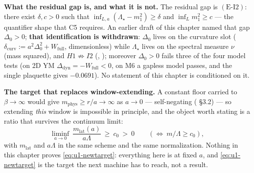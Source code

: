 \noindent\textbf{What the residual gap is, and what it is not.} The residual gap is
$(\mathrm{E\text{-}I2})$: there exist $\delta,c>0$ such that
$\inf_{L,a}(\Lambda_\star-m_1^2)\ge\delta$ and $\inf_L m_1^2\ge c$ --- the quantifier shape that
C5 requires. An earlier draft of this chapter named that gap $\Delta_0>0$; \textbf{that
identification is withdrawn}: $\Delta_0$ lives on the curvature slot
($\delta_{\mathrm{curv}}:=a^2\Delta_0^2+W_{\mathrm{full}}$, dimensionless) while $\Lambda_\star$
lives on the spectral measure $\nu$ (mass squared), and $H1\not\Rightarrow I2$
(, ); moreover $\Delta_0>0$ fails three of the four model tests
(on 2D YM $\Delta_{\mathrm{dyn}}=-W_{\mathrm{full}}<0$, on M6 a gapless model passes, and the single
plaquette gives $-0.0691$). No \LT{} statement of this chapter is conditioned on it.

\noindent\textbf{The target that replaces window-extending.} A constant floor carried to
$\beta\to\infty$ would give $m_{\mathrm{phys}}\ge r/a\to\infty$ as $a\to0$ --- self-negating
( \S3.2) --- so extending \emph{this} window is impossible in principle, and
the object worth stating is a ratio that survives the continuum limit:
\begin{equation}
\liminf_{a\to0}\ \frac{m_{\mathrm{lat}}(a)}{a\Lambda}\ \ge\ c_0\ >\ 0
\qquad(\Longleftrightarrow\ m/\Lambda\ge c_0),
\label{eq:u1-newtarget}
\end{equation}
with $m_{\mathrm{lat}}$ and $a\Lambda$ in the same scheme and the same normalization. Nothing in
this chapter proves \eqref{eq:u1-newtarget}: everything here is at fixed $a$, and
\eqref{eq:u1-newtarget} is the target the next machine has to reach, not a result.

